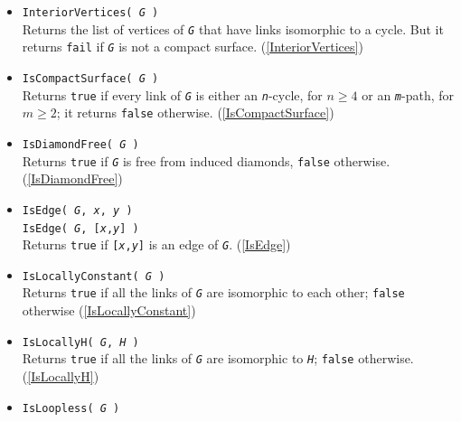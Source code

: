 \documentclass[a4paper,11pt]{report}
\begin{document}
{{\begin{itemize}
 Returns statistics for graph attribute \mbox{\texttt{\mdseries\slshape Attribute}}. (\ref{GraphAttributeStatistics}) 
\item \texttt{InteriorVertices( \mbox{\texttt{\mdseries\slshape G}} )}\\
 Returns the list of vertices of \mbox{\texttt{\mdseries\slshape G}} that have links isomorphic to a cycle. But it returns \texttt{fail} if \mbox{\texttt{\mdseries\slshape G}} is not a compact surface. (\ref{InteriorVertices}) 
\item \texttt{IsCompactSurface( \mbox{\texttt{\mdseries\slshape G}} )}\\
 Returns \texttt{true} if every link of \mbox{\texttt{\mdseries\slshape G}} is either an \mbox{\texttt{\mdseries\slshape n}}-cycle, for $n\geq 4$ or an \mbox{\texttt{\mdseries\slshape m}}-path, for $m\geq 2$; it returns \texttt{false} otherwise. (\ref{IsCompactSurface}) 
\item \texttt{IsDiamondFree( \mbox{\texttt{\mdseries\slshape G}} )}\\
 Returns \texttt{true} if \mbox{\texttt{\mdseries\slshape G}} is free from induced diamonds, \texttt{false} otherwise. (\ref{IsDiamondFree}) 
\item \texttt{IsEdge( \mbox{\texttt{\mdseries\slshape G}}, \mbox{\texttt{\mdseries\slshape x}}, \mbox{\texttt{\mdseries\slshape y}} )}\\
 \texttt{IsEdge( \mbox{\texttt{\mdseries\slshape G}}, [\mbox{\texttt{\mdseries\slshape x}},\mbox{\texttt{\mdseries\slshape y}}] )}\\
 Returns \texttt{true} if \texttt{[\mbox{\texttt{\mdseries\slshape x}},\mbox{\texttt{\mdseries\slshape y}}]} is an edge of \mbox{\texttt{\mdseries\slshape G}}. (\ref{IsEdge}) 
\item \texttt{IsLocallyConstant( \mbox{\texttt{\mdseries\slshape G}} )}\\
 Returns \texttt{true} if all the links of \mbox{\texttt{\mdseries\slshape G}} are isomorphic to each other; \texttt{false} otherwise (\ref{IsLocallyConstant}) 
\item \texttt{IsLocallyH( \mbox{\texttt{\mdseries\slshape G}}, \mbox{\texttt{\mdseries\slshape H}} )}\\
 Returns \texttt{true} if all the links of \mbox{\texttt{\mdseries\slshape G}} are isomorphic to \mbox{\texttt{\mdseries\slshape H}}; \texttt{false} otherwise. (\ref{IsLocallyH}) 
\item \texttt{IsLoopless( \mbox{\texttt{\mdseries\slshape G}} )}\\

\end{itemize}}}
\end{document}
